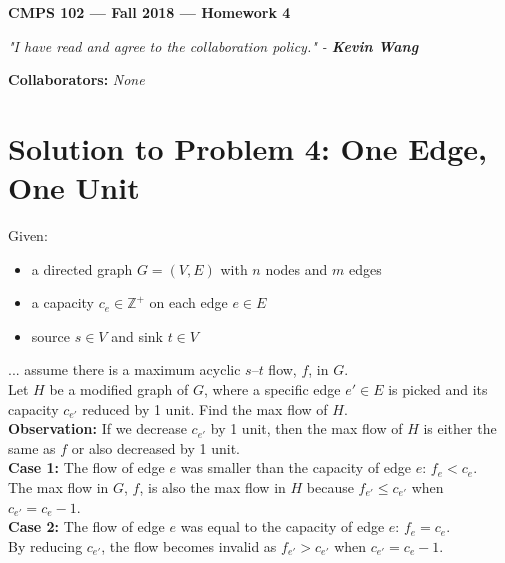 \documentclass[11pt]{article}
\theoremstyle{definition}
\theoremstyle{plain}
\theoremstyle{indented-remark}
\theoremstyle{indented-proof}
\begin{document}
\begin{center}
{\bf\Large CMPS 102 --- Fall 2018 ---  Homework 4}
\end{center}

\begin{center}
\textit{"I have read and agree to the collaboration policy." - \textbf{Kevin Wang}}
\end{center}
\begin{center}
{\footnotesize \textbf{Collaborators:} \textit{None}} 
\end{center}

\section*{Solution to Problem 4: One Edge, One Unit}

Given:
\begin{itemize}
\item a directed graph $G=(V,E)$ with $n$ nodes and $m$ edges
\item a capacity $c_{e} \in \mathbb{Z}^{+}$ on each edge $e \in E$
\item source $s \in V$ and sink $t \in V$
\end{itemize}

\noindent ... assume there is a maximum acyclic $s$--$t$ flow, $f$, in $G$. \\

\noindent Let $H$ be a modified graph of $G$, where a specific edge $e' \in E$ is picked and its capacity $c_{e'}$ reduced by 1 unit. Find the max flow of $H$. \\

\noindent \textbf{Observation:} If we decrease $c_{e'}$ by 1 unit, then the max flow of $H$ is either the same as $f$ or also decreased by 1 unit. \\

\textbf{Case 1:} The flow of edge $e$ was smaller than the capacity of edge $e$: $f_{e} < c_{e}$. \\

\indent \indent The max flow in $G$, $f$, is also the max flow in $H$ because $f_{e'} \leq c_{e'}$ when $c_{e'} = c_{e} - 1$. \\

\textbf{Case 2:} The flow of edge $e$ was equal to the capacity of edge $e$: $f_{e} = c_{e}$. \\

\indent \indent By reducing $c_{e'}$, the flow becomes invalid as $f_{e'} > c_{e'}$ when $c_{e'} = c_{e} - 1$. \\
\end{document}
